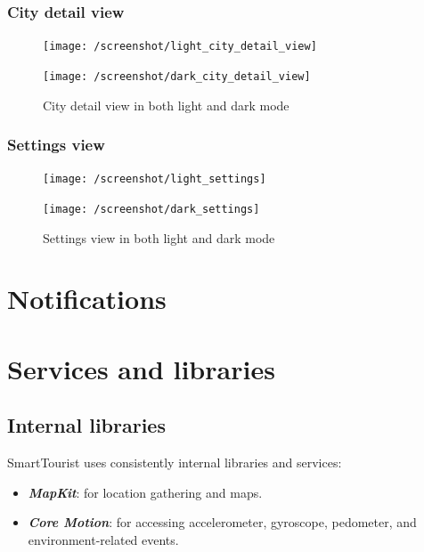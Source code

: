 \documentclass[a4paper, 11pt, parskip=half]{scrreprt}
\theoremstyle{definition}
\begin{document}
\subsection{City detail view}
\begin{figure}[H]
	\centering
	\begin{minipage}{.5\textwidth}
  	\centering
  	\texttt{[image: /screenshot/light\_city\_detail\_view]}
  	\label{fig:test1}
	\end{minipage}%
	\begin{minipage}{.5\textwidth}
  	\centering
  	\texttt{[image: /screenshot/dark\_city\_detail\_view]}
  	\label{fig:test2}
	\end{minipage}
	\caption{City detail view in both light and dark mode}
\end{figure}


\subsection{Settings view}
\begin{figure}[H]
	\centering
	\begin{minipage}{.5\textwidth}
  	\centering
  	\texttt{[image: /screenshot/light\_settings]}
  	\label{fig:test1}
	\end{minipage}%
	\begin{minipage}{.5\textwidth}
  	\centering
  	\texttt{[image: /screenshot/dark\_settings]}
  	\label{fig:test2}
	\end{minipage}
	\caption{Settings view in both light and dark mode}
\end{figure}


\chapter{Notifications}




\chapter{Services and libraries}

\section{Internal libraries}

SmartTourist uses consistently internal libraries and services:

\begin{itemize}
	\item \textbf{\textit{MapKit}}: for location gathering and maps.
	\item \textbf{\textit{Core Motion}}: for accessing accelerometer, gyroscope, pedometer, and environment-related events.
\end{itemize}
\end{document}
